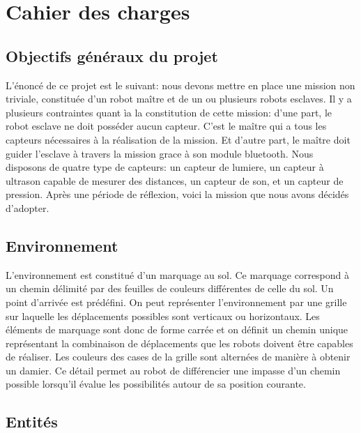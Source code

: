 \section{Cahier des charges}

  \subsection{Objectifs généraux du projet}

  L'\'{e}nonc\'{e} de ce projet est le suivant: nous devons mettre en place une mission non triviale, constitu\'{e}e d'un robot ma\^{i}tre et de un ou plusieurs robots esclaves. Il y a plusieurs contraintes quant \`{i}a la constitution de cette mission: d'une part, le robot esclave ne doit poss\'{e}der aucun capteur. C'est le ma\^{i}tre qui a tous les capteurs n\'{e}cessaires à la réalisation de la mission. Et d'autre part, le ma\^{i}tre doit guider l'esclave \`{a} travers la mission grace à son module bluetooth. Nous disposons de quatre type de capteurs: un capteur de lumiere, un capteur à ultrason capable de mesurer des distances, un capteur de son, et un capteur de pression. Après une p\'{e}riode de r\'{e}flexion, voici la mission que nous avons d\'{e}cid\'{e}s d'adopter.

  \subsection{Environnement}
  L'environnement est constitu\'{e} d'un marquage au sol. Ce marquage
  correspond \`{a} un chemin d\'{e}limit\'{e} par des feuilles de couleurs
  diff\'{e}rentes de celle du sol. Un point d'arriv\'{e}e est pr\'{e}d\'{e}fini. On peut
  repr\'{e}senter l'environnement par une grille sur laquelle les
  d\'{e}placements possibles sont verticaux ou horizontaux. Les \'{e}l\'{e}ments de
  marquage sont donc de forme carr\'{e}e et on d\'{e}finit un chemin unique
  repr\'{e}sentant la combinaison de d\'{e}placements que les robots doivent
  \^{e}tre capables de r\'{e}aliser. Les couleurs des cases de la grille sont
  altern\'{e}es de mani\`{e}re \`{a} obtenir un damier. Ce d\'{e}tail permet au robot de
  diff\'{e}rencier une impasse d'un chemin possible lorsqu'il \'{e}value les
  possibilit\'{e}s autour de sa position courante.

  \subsection{Entit\'{e}s}

